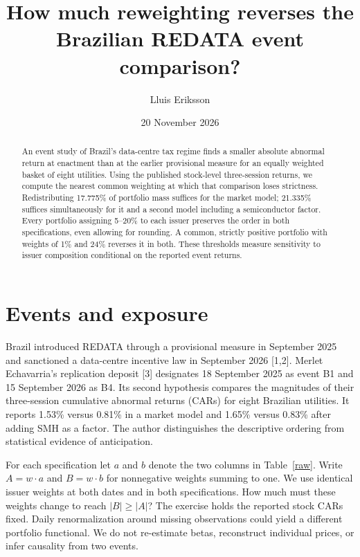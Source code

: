 \documentclass[11pt]{article}
\title{How much reweighting reverses the Brazilian REDATA event comparison?}
\author{Lluis Eriksson}\date{20 November 2026}
\begin{document}
\maketitle
\begin{abstract}
An event study of Brazil's data-centre tax regime finds a smaller absolute abnormal return at enactment than at the earlier provisional measure for an equally weighted basket of eight utilities. Using the published stock-level three-session returns, we compute the nearest common weighting at which that comparison loses strictness. Redistributing 17.775\% of portfolio mass suffices for the market model; 21.335\% suffices simultaneously for it and a second model including a semiconductor factor. Every portfolio assigning 5--20\% to each issuer preserves the order in both specifications, even allowing for rounding. A common, strictly positive portfolio with weights of 1\% and 24\% reverses it in both. These thresholds measure sensitivity to issuer composition conditional on the reported event returns.
\end{abstract}
\section{Events and exposure}
Brazil introduced REDATA through a provisional measure in September 2025 and sanctioned a data-centre incentive law in September 2026 [1,2]. Merlet Echavarria's replication deposit [3] designates 18 September 2025 as event B1 and 15 September 2026 as B4. Its second hypothesis compares the magnitudes of their three-session cumulative abnormal returns (CARs) for eight Brazilian utilities. It reports 1.53\% versus 0.81\% in a market model and 1.65\% versus 0.83\% after adding SMH as a factor. The author distinguishes the descriptive ordering from statistical evidence of anticipation.

For each specification let $a$ and $b$ denote the two columns in Table~\ref{raw}. Write $A=w\cdot a$ and $B=w\cdot b$ for nonnegative weights summing to one. We use identical issuer weights at both dates and in both specifications. How much must these weights change to reach $|B|\geq|A|$? The exercise holds the reported stock CARs fixed. Daily renormalization around missing observations could yield a different portfolio functional. We do not re-estimate betas, reconstruct individual prices, or infer causality from two events.
\end{document}
